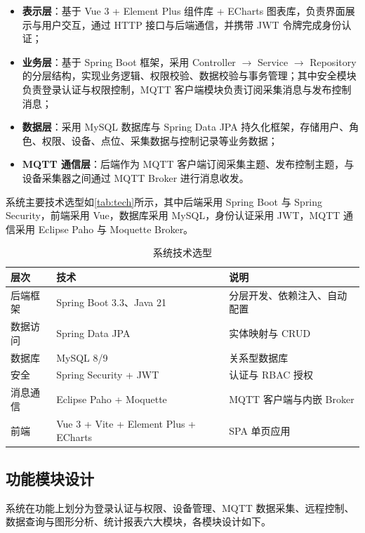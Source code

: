 \documentclass[12pt,hyperref,a4paper,UTF8]{ctexart}
\begin{document}
\begin{itemize}
    \item \textbf{表示层}：基于 Vue 3 + Element Plus 组件库 + ECharts 图表库，负责界面展示与用户交互，通过 HTTP 接口与后端通信，并携带 JWT 令牌完成身份认证；
    \item \textbf{业务层}：基于 Spring Boot 框架，采用 Controller $\rightarrow$ Service $\rightarrow$ Repository 的分层结构，实现业务逻辑、权限校验、数据校验与事务管理；其中安全模块负责登录认证与权限控制，MQTT 客户端模块负责订阅采集消息与发布控制消息；
    \item \textbf{数据层}：采用 MySQL 数据库与 Spring Data JPA 持久化框架，存储用户、角色、权限、设备、点位、采集数据与控制记录等业务数据；
    \item \textbf{MQTT 通信层}：后端作为 MQTT 客户端订阅采集主题、发布控制主题，与设备采集器之间通过 MQTT Broker 进行消息收发。
\end{itemize}

系统主要技术选型如\autoref{tab:tech}所示，其中后端采用 Spring Boot 与 Spring Security，前端采用 Vue，数据库采用 MySQL，身份认证采用 JWT，MQTT 通信采用 Eclipse Paho 与 Moquette Broker。

\begin{table}[!htbp]
    \centering
    \caption{系统技术选型}
    \label{tab:tech}
    \begin{tabularx}{0.90\textwidth}{@{}L{2.2cm} L{5.3cm} Y@{}}
    \toprule
    \textbf{层次} & \textbf{技术} & \textbf{说明} \\
    \midrule
    后端框架 & Spring Boot 3.3、Java 21 & 分层开发、依赖注入、自动配置 \\
    数据访问 & Spring Data JPA & 实体映射与 CRUD \\
    数据库 & MySQL 8/9 & 关系型数据库 \\
    安全 & Spring Security + JWT & 认证与 RBAC 授权 \\
    消息通信 & Eclipse Paho + Moquette & MQTT 客户端与内嵌 Broker \\
    前端 & Vue 3 + Vite + Element Plus + ECharts & SPA 单页应用 \\
    \bottomrule
    \end{tabularx}
\end{table}

\subsection{功能模块设计}

系统在功能上划分为登录认证与权限、设备管理、MQTT 数据采集、远程控制、数据查询与图形分析、统计报表六大模块，各模块设计如下。
\end{document}
